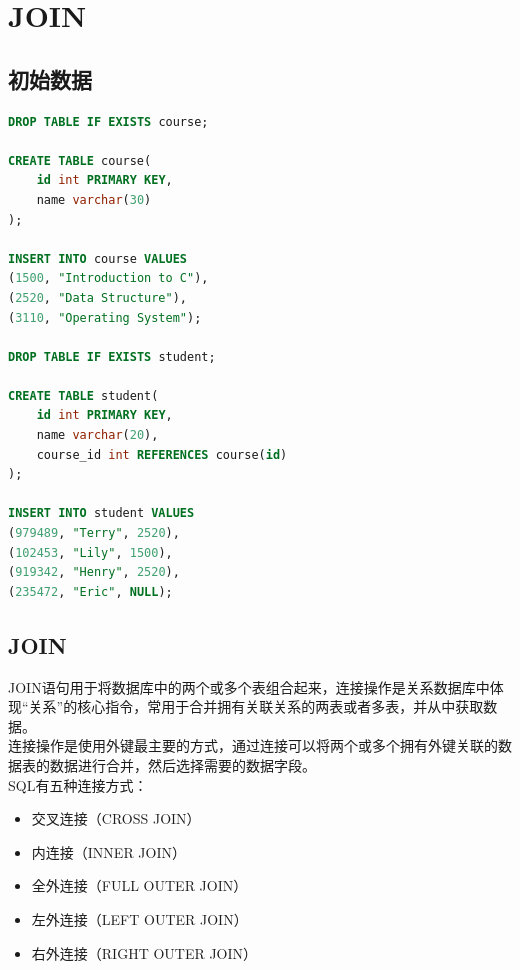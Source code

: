 \documentclass[12pt, openany, oneside]{book}
\begin{document}
\newpage

\chapter{JOIN}

\section{初始数据}


\begin{lstlisting}[language=SQL]
DROP TABLE IF EXISTS course;

CREATE TABLE course(
    id int PRIMARY KEY,
    name varchar(30)
);

INSERT INTO course VALUES
(1500, "Introduction to C"),
(2520, "Data Structure"),
(3110, "Operating System");

DROP TABLE IF EXISTS student;

CREATE TABLE student(
    id int PRIMARY KEY,
    name varchar(20),
    course_id int REFERENCES course(id)
);

INSERT INTO student VALUES
(979489, "Terry", 2520),
(102453, "Lily", 1500),
(919342, "Henry", 2520),
(235472, "Eric", NULL);
\end{lstlisting}

\section{JOIN}

JOIN语句用于将数据库中的两个或多个表组合起来，连接操作是关系数据库中体现“关系”的核心指令，常用于合并拥有关联关系的两表或者多表，并从中获取数据。 \\

连接操作是使用外键最主要的方式，通过连接可以将两个或多个拥有外键关联的数据表的数据进行合并，然后选择需要的数据字段。 \\

SQL有五种连接方式：

\begin{itemize}
    \item 交叉连接（CROSS JOIN）
    \item 内连接（INNER JOIN）
    \item 全外连接（FULL OUTER JOIN）
    \item 左外连接（LEFT OUTER JOIN）
    \item 右外连接（RIGHT OUTER JOIN）
\end{itemize}
\end{document}
